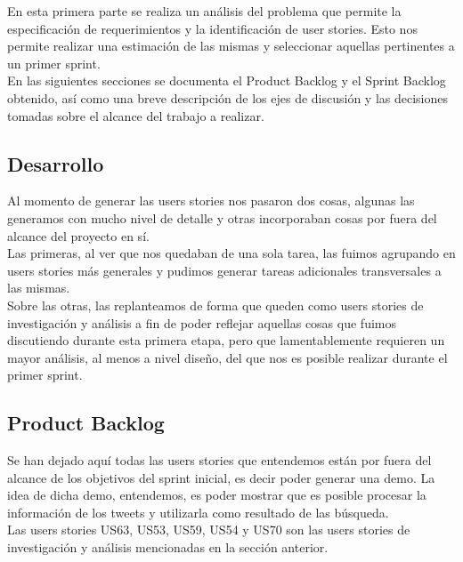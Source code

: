 En esta primera parte se realiza un análisis del problema que permite la especificación de requerimientos y la identificación de user stories. Esto nos permite realizar una estimación de las mismas y seleccionar aquellas pertinentes a un primer sprint.\\

En las siguientes secciones se documenta el Product Backlog y el Sprint Backlog obtenido, así como una breve descripción de los ejes de discusión y las decisiones tomadas sobre el alcance del trabajo a realizar.\\

\subsection{Desarrollo}
Al momento de generar las users stories nos pasaron dos cosas, algunas las generamos con mucho nivel de detalle y otras incorporaban cosas por fuera del alcance del proyecto en sí. \\
Las primeras, al ver que nos quedaban de una sola tarea, las fuimos agrupando en users stories más generales y pudimos generar tareas adicionales transversales a las mismas.\\
Sobre las otras, las replanteamos de forma que queden como users stories de investigación y análisis a fin de poder reflejar aquellas cosas que fuimos discutiendo durante esta primera etapa, pero que lamentablemente requieren un mayor análisis, al menos a nivel diseño, del que nos es posible realizar durante el primer sprint. 

\subsection{Product Backlog}
Se han dejado aquí todas las users stories que entendemos están por fuera del alcance de los objetivos del sprint inicial, es decir poder generar una demo. La idea de dicha demo, entendemos, es poder mostrar que es posible procesar la información de los tweets y utilizarla como resultado de las búsqueda. \\
Las users stories US63, US53, US59, US54 y US70 son las users stories de investigación y análisis mencionadas en la sección anterior.\\
\newpage


